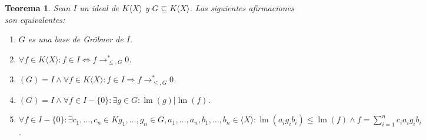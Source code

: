 \documentclass[12pt]{report}
\theoremstyle{customstyle}
\newtheorem{theorem}{Teorema}[chapter]
\theoremstyle{factstyle}
\DeclareMathOperator{\lm}{lm}
\begin{document}
\begin{theorem}\label{thm:equivalencias de base de Gröbner}
  Sean $I$ un ideal de $K⟨X⟩$ y $G ⊆ K⟨X⟩$. Las siguientes afirmaciones son equivalentes:
  \begin{enumerate}
    \item $G$ es una base de Gröbner de $I$.

    \item $∀f ∈ K⟨X⟩ : f ∈ I ⇔ f →^*_{≤, G} 0$.

    \item $(G) = I ∧ ∀f ∈ K⟨X⟩ : f ∈ I ⇒ f →^*_{≤, G} 0$.

    \item $(G) = I ∧ ∀f ∈ I - \{0\} : ∃g ∈ G : \lm(g) | \lm(f)$.

    \item $∀f ∈ I - \{0\} : ∃c_1, …, c_n ∈ K g_1, …, g_n ∈ G, a_1, …, a_n, b_1, …, b_n ∈ ⟨X⟩ : \lm(a_i g_i b_i) ≤ \lm(f) ∧ f = ∑_{i = 1}^n c_i a_i g_i b_i$.
  \end{enumerate}
\end{theorem}
\end{document}
